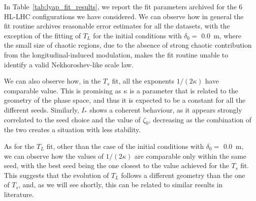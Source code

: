In Table~\ref{tab:lyap_fit_results}, we report the fit parameters archived for the 6 HL-LHC configurations we have considered. We can observe how in general the fit routine archives reasonable error estimates for all the datasets, with the exception of the fitting of $T_L$ for the initial conditions with $\delta_0 =$ \SI{0.0}{\metre}, where the small size of chaotic regions, due to the absence of strong chaotic contribution from the longitudinal-induced modulation, makes the fit routine unable to identify a valid Nekhoroshev-like scale law.

We can also observe how, in the $T_s$ fit, all the exponents $1/(2\kappa)$ have comparable value. This is promising as $\kappa$ is a parameter that is related to the geometry of the phase space, and thus it is expected to be a constant for all the different seeds. Similarly, $I_\ast$ shows a coherent behaviour, as it appears strongly correlated to the seed choice and the value of $\zeta_0$, decreasing as the combination of the two creates a situation with less stability.

As for the $T_L$ fit, other than the case of the initial conditions with $\delta_0 =$ \SI{0.0}{\metre}, we can observe how the values of $1/(2\kappa)$ are comparable only within the same seed, with the best seed being the one closest to the value achieved for the $T_s$ fit. This suggests that the evolution of $T_L$ follows a different geometry than the one of $T_s$, and, as we will see shortly, this can be related to similar results in literature. 

